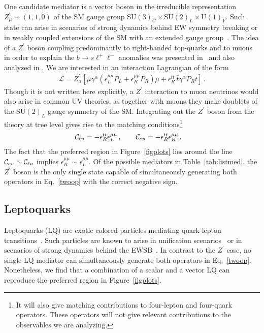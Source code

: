 \documentclass[aps,twocolumn,showpacs,preprintnumbers,amsmath,amssymb,floatfix,nofootinbib]{revtex4-1}
\newcommand{\C}{{\cal C}}
\begin{document}
One candidate mediator is a vector boson in the irreducible representation $Z_{\mu}^{\prime} \sim (1,1,0)$ of the SM gauge group $\mathrm{SU(3)}_C \times \mathrm{SU(2)}_L \times \mathrm{U(1)}_Y$.  Such state can arise in scenarios of strong dynamics behind EW symmetry breaking or in weakly coupled extensions of the SM with an extended gauge group~\cite{Langacker:2008yv}.   The idea of a $Z^{\prime}$ boson coupling predominantly to right-handed top-quarks and to muons in order to explain the $b\to s \ell^+ \ell^-$ anomalies was presented in~\cite{Kamenik:2017tnu} and also analyzed in \cite{Fox:2018ldq}.    We are interested in an interaction Lagrangian of the form
%
\begin{align}  \label{eq:zprime}
\mathcal{L} =   Z_{\alpha}^{\prime}  \left[  \bar \mu    \gamma^{\alpha}  (   \epsilon_L^{\mu \mu}   P_L   +  \epsilon_R^{\mu \mu}  P_R )   \mu  +      \epsilon_{R}^{tt}  \, \bar t  \gamma^{\alpha}  P_R   t     \right] \,.
\end{align}
%
Though it is not written here explicitly, a $Z^{\prime}$ interaction to muon neutrinos would also arise in common UV theories, as together with muons they make doublets of the $\mathrm{SU(2)}_L$ gauge symmetry of the SM. Integrating out the $Z^{\prime}$ boson from the theory at tree level gives rise to the matching conditions\footnote{It will also give matching contributions to four-lepton and four-quark operators.  These operators will not give relevant contributions to the observables we are analyzing. }
%
\begin{align}
\C_{\ell u} &= -     \epsilon_{R}^{tt}      \epsilon_L^{\mu \mu}   \,, \qquad  \C_{eu} = -      \epsilon_{R}^{tt}      \epsilon_R^{\mu \mu}  \,.
\end{align}
%
The fact that the preferred region in Figure~\ref{figplots} lies around the line $\C_{eu}  \sim \C_{\ell u}$ implies $\epsilon_R^{\mu \mu} \sim      \epsilon_L^{\mu \mu}$.  Of the possible mediators in Table~\ref{tab:listmed}, the $Z^\prime$ boson is the only single state capable of simultaneously generating both operators in Eq.~\eqref{twoop} with the correct negative sign.   



\subsection{Leptoquarks}  \label{seclqs}

Leptoquarks (LQ) are exotic colored particles mediating quark-lepton transitions~\cite{Buchmuller:1986zs,Dorsner:2016wpm}.  Such particles are known to arise in unification scenarios~\cite{Georgi:1974sy,Pati:1974yy} or in scenarios of strong dynamics behind the EWSB~\cite{Gripaios:2009dq}.  In contrast to the $Z^\prime$ case, no single LQ mediator can simultaneously generate both operators in Eq.~\eqref{twoop}.  Nonetheless, we find that a combination of a scalar and a vector LQ can reproduce the preferred region in Figure~\ref{figplots}. 
\end{document}

